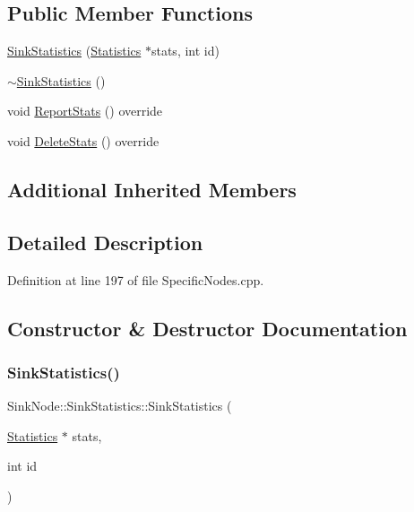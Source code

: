 \subsection*{Public Member Functions}
\begin{DoxyCompactItemize}
\item 
\hyperlink{class_sink_node_1_1_sink_statistics_a28ec0eaaa52bf842b7414f8c67b4bd5d}{Sink\+Statistics} (\hyperlink{class_generic_node_1_1_statistics}{Statistics} $\ast$stats, int id)
\item 
\hyperlink{class_sink_node_1_1_sink_statistics_af8f01207bb1d835b89267a7857c08cb6}{$\sim$\+Sink\+Statistics} ()
\item 
void \hyperlink{class_sink_node_1_1_sink_statistics_a2b8337521bc63a06000571aaede60ad9}{Report\+Stats} () override
\item 
void \hyperlink{class_sink_node_1_1_sink_statistics_a9bd64cbc1cbe5f75ae5bd4971a3453b0}{Delete\+Stats} () override
\end{DoxyCompactItemize}
\subsection*{Additional Inherited Members}


\subsection{Detailed Description}


Definition at line 197 of file Specific\+Nodes.\+cpp.



\subsection{Constructor \& Destructor Documentation}
\mbox{\label{class_sink_node_1_1_sink_statistics_a28ec0eaaa52bf842b7414f8c67b4bd5d}} 
\subsubsection{\texorpdfstring{Sink\+Statistics()}{SinkStatistics()}}
{\footnotesize\ttfamily Sink\+Node\+::\+Sink\+Statistics\+::\+Sink\+Statistics (\begin{DoxyParamCaption}\item[{\hyperlink{class_generic_node_1_1_statistics}{Statistics} $\ast$}]{stats,  }\item[{int}]{id }\end{DoxyParamCaption})\hspace{0.3cm}{\ttfamily [inline]}}



